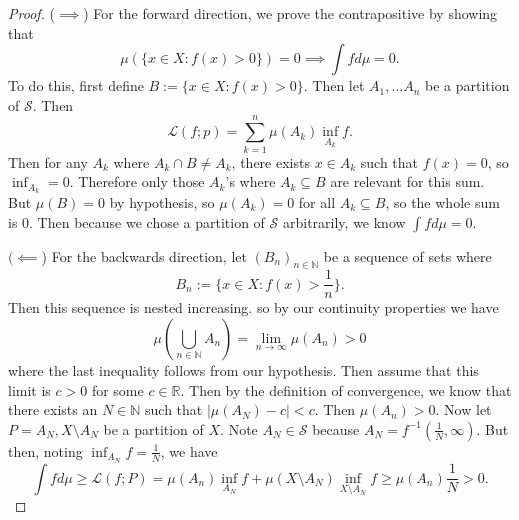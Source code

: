 \documentclass[12pt]{article}
\def\R{\mathbb{R}}
\def\N{\mathbb{N}}
\begin{document}
\begin{proof}
    ($\implies$) For the forward direction, we prove the contrapositive by showing that $$\mu( \{ x \in X: f(x) > 0\}) = 0 \implies \int f d \mu = 0.$$
    To do this, first define $B := \{ x \in X: f(x) > 0\}$. Then let $A_1, \ldots A_n$ be a partition of $\mathcal{S}$. Then $$\mathcal{L} (f; p) = \sum_{k=1}^{n} \mu (A_k) \inf_{A_k} f.$$ Then for any $A_k$ where $A_k \cap B \neq A_k$, there exists $x \in A_k$ such that $f(x) = 0$, so $\inf_{A_k} = 0$. Therefore only those $A_k$'s where $A_k \subseteq B$ are relevant for this sum. But $\mu(B) = 0$ by hypothesis, so $\mu(A_k) = 0$ for all $A_k \subseteq B$, so the whole sum is 0. Then because we chose a partition of $\mathcal{S}$ arbitrarily, we know $\int f d \mu = 0$.

    $(\impliedby$) For the backwards direction, let $(B_n)_{n \in \N}$ be a sequence of sets where $$B_n := \{x \in X : f(x) > \frac{1}{n}\}.$$ Then this sequence is nested increasing. so by our continuity properties we have $$\mu(\bigcup_{n \in \N} A_n) = \lim_{n \to \infty} \mu (A_n) > 0$$ where the last inequality follows from our hypothesis. Then assume that this limit is $c > 0$ for some $c \in \R$. Then by the definition of convergence, we know that there exists an $N \in \N$ such that $|\mu (A_N) - c| < c$. Then $\mu(A_n) > 0$. Now let $P = A_N, X \setminus A_N$ be a partition of $X$. Note $A_N \in \mathcal{S}$ because $A_N = f^{-1} (\frac{1}{N}, \infty)$. But then, noting $\inf_{A_N} f = \frac{1}{N}$, we have $$\int f d \mu \geq \mathcal{L} (f; P) = \mu (A_n) \inf_{A_N} f + \mu (X \setminus A_N) \inf_{X \setminus A_N} f \geq \mu (A_n) \frac{1}{N} > 0.$$
\end{proof}
\end{document}
